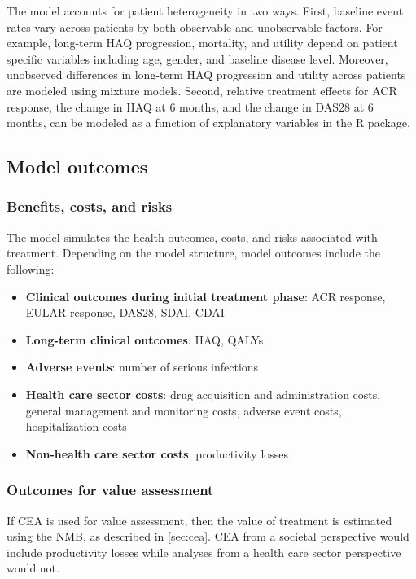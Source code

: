 \documentclass[11pt,final,fleqn]{article}
\theoremstyle{plain}
\newcommand\R{{\textsf{R}}}
\begin{document}
The model accounts for patient heterogeneity in two ways. First, baseline event rates vary across patients by both observable and unobservable factors. For example, long-term HAQ progression, mortality, and utility depend on patient specific variables including age, gender, and baseline disease level. Moreover, unobserved differences in long-term HAQ progression and utility across patients are modeled using mixture models. Second, relative treatment effects for ACR response, the change in HAQ at 6 months, and the change in DAS28 at 6 months, can be modeled as a function of explanatory variables in the \R{} package. 

\subsection{Model outcomes}\label{model-outcomes}
\subsubsection{Benefits, costs, and risks} \label{subsec:benefits-risks-costs}
The model simulates the health outcomes, costs, and risks associated with treatment. Depending on the model structure, model outcomes include the following:
\begin{itemize}
\item \textbf{Clinical outcomes during initial treatment phase}: ACR response, EULAR response, DAS28, SDAI, CDAI
\item \textbf{Long-term clinical outcomes}: HAQ, QALYs
\item \textbf{Adverse events}: number of serious infections
\item \textbf{Health care sector costs}: drug acquisition and administration costs, general management and monitoring costs, adverse event costs, hospitalization costs
\item \textbf{Non-health care sector costs}: productivity losses
\end{itemize}

\subsubsection{Outcomes for value assessment}
If CEA is used for value assessment, then the value of treatment is estimated using the NMB, as described in \autoref{sec:cea}. CEA from a societal perspective would include productivity losses while analyses from a health care sector perspective would not.
\end{document}
